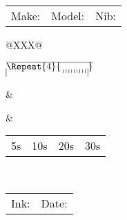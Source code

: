 \documentclass[letterpaper,12pt]{memoir}
\makeatletter
\newcommand{\r@p}[1]{\hbox to 1mm{\hfil#1}}
\newcommand{\r@startT}{\vrule height 1pt depth 8pt}
\newcommand{\r@t}{\r@p{\vrule height 0pt depth 4pt}}
\newcommand{\r@T}{\r@p{\r@startT}}
\newcommand{\r@cm}{\r@t\r@t\r@t\r@t\r@t\r@t\r@t\r@t\r@t\r@T}
\newcommand{\r@r}[1]{$\vcenter{\hrule\hbox{\r@startT#1}}$}
\newcommand{\cmruler}[1]{\r@r{\Repeat{#1}{\r@cm}}}
\newcommand{\prettytitle}{TEST TITLE}
\newenvironment{prettyframed}[1]
{
\renewcommand{\prettytitle}{#1}
\begin{mdframed}[style=prettystyle]
}
{
\end{mdframed}
}
\makeatother
\begin{document}
\begin{tabularx}{\textwidth}{@{}XXX@{}}
Make: \textcolor{lightgray}{\hrulefill} & Model: \textcolor{lightgray}{\hrulefill} & Nib: \textcolor{lightgray}{\hrulefill}
\end{tabularx}

\begin{prettyframed}{Normal Writing}
  \vspace{0.75in}
\end{prettyframed}

\begin{prettyframed}{Fast Writing}
  \vspace{0.75in}
\end{prettyframed}

\begin{tabularx}{\textwidth}{@{}XXX@{}}
  \begin{prettyframed}{Line Variation}
    \begin{minipage}[t][1.5in][t]{\textwidth}
      \begin{vplace}[0.2]
        \cmruler{4}
      \end{vplace}
    \end{minipage}
  \end{prettyframed} &
                       \begin{prettyframed}{Wetness}
                         \begin{minipage}[t][1.5in][t]{\textwidth}

                         \end{minipage}
                       \end{prettyframed} &
                                            \begin{prettyframed}{Dry Time}
                                              \begin{minipage}[t][1.5in][t]{\textwidth}
                                                {\begin{tabularx}{\textwidth}{cXXX}
                                                   5s & 10s & 20s & 30s
                                                 \end{tabularx}}
                                              \end{minipage}
                                            \end{prettyframed} \\
\end{tabularx}

\vspace{\fill}

\begin{tabularx}{\textwidth}{@{}X r@{}}
Ink: \hrulefill & Date: \underline{\hspace{5cm}}
\end{tabularx}
\end{document}
